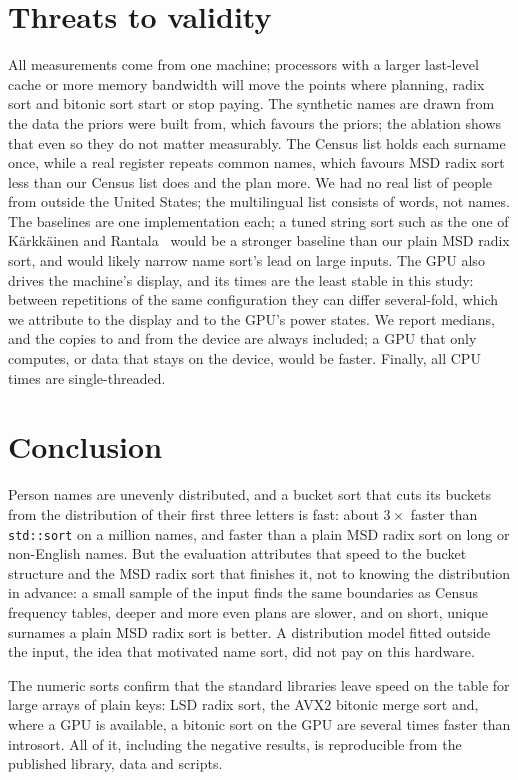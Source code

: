 \documentclass[11pt]{article}
\theoremstyle{definition}
\begin{document}
\section{Threats to validity}

All measurements come from one machine; processors with a larger last-level
cache or more memory bandwidth will move the points where planning, radix
sort and bitonic sort start or stop paying. The synthetic names are drawn
from the data the priors were built from, which favours the priors; the
ablation shows that even so they do not matter measurably. The Census list
holds each surname once, while a real register repeats common names, which
favours MSD radix sort less than our Census list does and the plan more.
We had no real list of people from outside the United States; the
multilingual list consists of words, not names. The baselines are one
implementation each; a tuned string sort such as the one of
K\"arkk\"ainen and Rantala~\cite{karkkainen2008radix} would be a stronger
baseline than our plain MSD radix sort, and would likely narrow name sort's
lead on large inputs. The GPU also drives the machine's display, and its times
are the least stable in this study: between repetitions of the same
configuration they can differ several-fold, which we attribute to the
display and to the GPU's power states. We report medians, and the copies to
and from the device are always included; a GPU that only computes, or data
that stays on the device, would be faster. Finally, all CPU times are
single-threaded.

\section{Conclusion}

Person names are unevenly distributed, and a bucket sort that cuts its
buckets from the distribution of their first three letters is fast: about
$3\times$ faster than \texttt{std::sort} on a million names, and faster than
a plain MSD radix sort on long or non-English names. But the evaluation
attributes that speed to the bucket structure and the MSD radix sort that
finishes it, not to knowing the distribution in advance: a small sample of
the input finds the same boundaries as Census frequency tables, deeper and
more even plans are slower, and on short, unique surnames a plain MSD radix
sort is better. A distribution model fitted outside the input, the idea that
motivated name sort, did not pay on this hardware.

The numeric sorts confirm that the standard libraries leave speed on the
table for large arrays of plain keys: LSD radix sort, the AVX2 bitonic merge
sort and, where a GPU is available, a bitonic sort on the GPU are several
times faster than introsort. All of it, including the negative results, is
reproducible from the published library, data and scripts.
\end{document}
